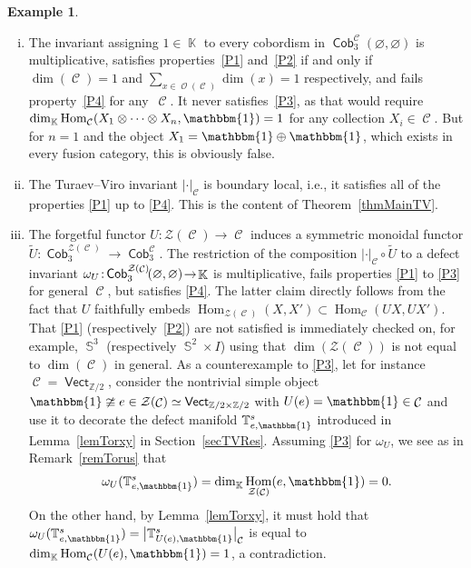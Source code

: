 \documentclass[pdftex]{sigma}
\DeclareMathOperator{\Hom}{Hom}
\DeclareMathOperator{\vect}{\mathsf{Vect}}
\DeclareMathOperator{\K}{\mathbb{K}}
\DeclareMathOperator{\Sp}{\mathbb{S}}
\DeclareMathOperator{\Cob}{\mathsf{Cob}}
\DeclareMathOperator{\calc}{\mathcal{C}}
\DeclareMathOperator{\calo}{\mathcal{O}}
\numberwithin{equation}{section}
\theoremstyle{definition}
\newtheorem{Example}[Example]{Example}
\begin{document}
\begin{Example}\label{exProp}\quad
 \begin{enumerate}[(i)]\itemsep=0pt
 \item The invariant assigning $1 \in \K$ to every cobordism in $\Cob_3^{\calc}(\varnothing, \varnothing)$ is multiplicative, satisfies properties~\ref{P1} and~\ref{P2} if and only if $\dim(\calc) = 1$ and $\sum_{x \in \calo(\calc)}\dim(x) = 1$ respectively, and fails property~\ref{P4} for any~$\calc$. It never satisfies~\ref{P3}, as that would require $\dim_{\K}\Hom_{\calc}(X_1 \otimes \dots \otimes X_n, \mathbbm{1}) = 1$ for any collection $X_i \in \calc$. But for $n = 1$ and the object $X_1 = \mathbbm{1} \oplus \mathbbm{1}$, which exists in every fusion category, this is obviously false.
 \item The Turaev--Viro invariant $| \cdot |_{\calc}$ is boundary local, i.e., it satisfies all of the properties \ref{P1} up to \ref{P4}. This is the content of Theorem~\ref{thmMainTV}.
 \item The forgetful functor $U\colon \mathcal{Z}(\calc) \rightarrow \calc$ induces a symmetric monoidal functor $\widetilde{U}\colon \Cob_3^{\mathcal{Z}(\calc)} \rightarrow \Cob_3^{\calc}$. The restriction of the composition $|\cdot|_{\calc} \circ {\widetilde{U}}$ to a defect invariant $\omega_U\colon\! {\smash{\Cob_3^{\mathcal{Z}(\calc)}\!(\varnothing, \varnothing)}\! \rightarrow\! \K}$ is multiplicative, fails properties \ref{P1} to \ref{P3} for general $\calc$, but satisfies \ref{P4}. The latter claim directly follows from the fact that $U$ faithfully embeds $\Hom_{\mathcal{Z}(\calc)}(X, X') \subset \Hom_{\calc}(UX, UX')$. That \ref{P1} (respectively~\ref{P2}) are not satisfied is immediately checked on, for example, $\Sp^3$ (respectively $\Sp^2 \times I$) using that $\dim(\mathcal{Z}(\calc))$ is not equal to $\dim(\calc)$ in general. As a counterexample to \ref{P3}, let for instance $\calc = \vect_{\mathbb{Z}/2}$, consider the nontrivial simple object $\mathbbm{1}\ncong e \in \mathcal{Z}(\calc) \simeq \vect_{\mathbb{Z}/2 \times \mathbb{Z}/2}$ with $U(e) = \mathbbm{1} \in \calc$ and use it to decorate the defect manifold $\mathbb{T}_{e, \mathbbm{1}}^s$ introduced in Lemma~\ref{lemTorxy} in Section~\ref{secTVRes}. Assuming \ref{P3} for $\omega_U$, we see as in Remark~\ref{remTorus} that
 \begin{align*}
 \omega_U (\mathbb{T}_{e, \mathbbm{1}}^s ) = \dim_{\K}\Hom_{\mathcal{Z}(\calc)}(e, \mathbbm{1}) = 0.
 \end{align*}
 On the other hand, by Lemma~\ref{lemTorxy}, it must hold that $\omega_U (\mathbb{T}_{e, \mathbbm{1}}^s ) = \bigl|\mathbb{T}_{U(e), \mathbbm{1}}^s\bigr|_{\calc}$ is equal to $\dim_{\K}\Hom_{\calc}(U(e), \mathbbm{1}) = 1$, a contradiction.

\end{enumerate}
\end{Example}
\end{document}

